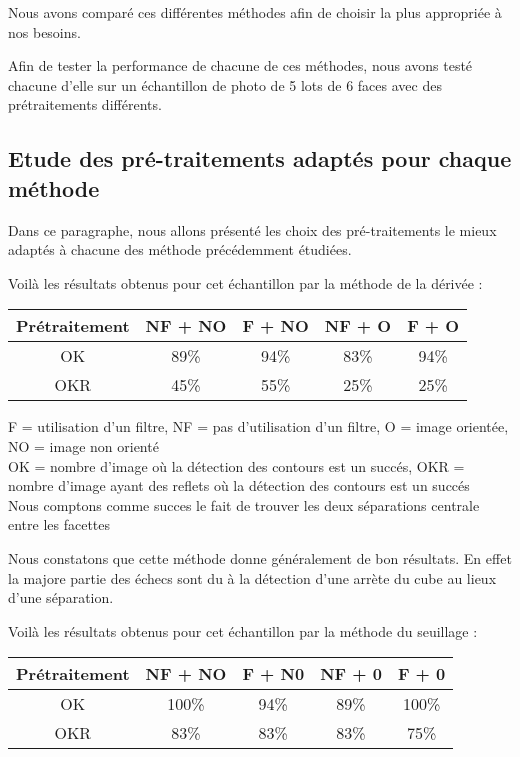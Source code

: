   Nous avons comparé ces différentes méthodes afin de choisir la plus appropriée à nos besoins. 

  Afin de tester la performance de chacune de ces méthodes, nous avons testé chacune d'elle sur un échantillon de photo de 5 lots de 6 faces avec des prétraitements différents.

\subsection*{Etude des pré-traitements adaptés pour chaque méthode}

  Dans ce paragraphe, nous allons présenté les choix des pré-traitements le mieux adaptés à chacune des méthode précédemment étudiées. 

  Voilà les résultats obtenus pour cet échantillon par la méthode de la dérivée : \\
\begin{tabular}{|c|c|c|c|c|}
  \hline
 \textbf{Prétraitement} & NF + NO & F + NO & NF + O & F + O  \\
  \hline
  OK & 89\% & 94\% & 83\% & 94\% \\ %
  OKR & 45\% & 55\% & 25\% & 25\% \\  %
  \hline 
\end{tabular}

F = utilisation d'un filtre, NF = pas d'utilisation d'un filtre, O = image orientée, NO = image non orienté \\
OK = nombre d'image où la détection des contours est un succés, OKR = nombre d'image ayant des reflets où la détection des contours est un succés\\

Nous comptons comme succes le fait de trouver les deux séparations centrale entre les facettes
  
  Nous constatons que cette méthode donne généralement de bon résultats. En effet la majore partie des échecs sont du à la détection d'une arrète du cube au lieux d'une séparation.  %


  Voilà les résultats obtenus pour cet échantillon par la méthode du seuillage : \\
\begin{tabular}{|c|c|c|c|c|}
  \hline
 \textbf{Prétraitement} & NF + NO & F + N0 & NF + 0 & F + 0  \\
  \hline
  OK & 100\% & 94\% & 89\% & 100\% \\ %
  OKR & 83\% & 83\% & 83\% & 75\% \\ %
  \hline 
\end{tabular}

